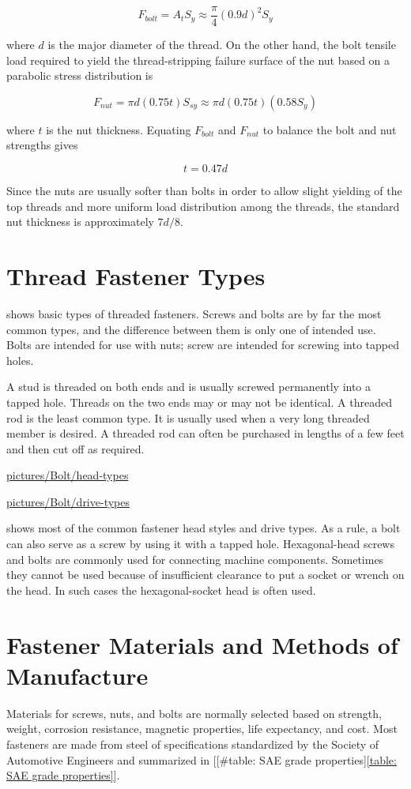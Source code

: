 \documentclass[a4paper,openany,12pt]{book}
\begin{document}
{{$$F_{bolt} = A_tS_y \approx \frac{\pi}{4}(0.9d)^2S_y$$

where \(d\) is the major diameter of the thread. On the other hand, the
bolt tensile load required to yield the thread-stripping failure surface
of the nut based on a parabolic stress distribution is

$$F_{nut} = \pi d(0.75t)S_{sy} \approx \pi d(0.75t)(0.58S_y)$$

where \(t\) is the nut thickness. Equating \(F_{bolt}\) and \(F_{nut}\) to
balance the bolt and nut strengths gives


$$\label{eqn: required nut thickness}
  t = 0.47d$$

Since the nuts are usually softer than bolts in order to allow slight
yielding of the top threads and more uniform load distribution among the
threads, the standard nut thickness is approximately \(7d/8\).

\section{Thread Fastener Types}
\label{thread-fastener-types}
shows basic types of threaded fasteners. Screws and bolts are by far the
most common types, and the difference between them is only one of
intended use. Bolts are intended for use with nuts; screw are intended
for screwing into tapped holes.


A stud is threaded on both ends and is usually screwed permanently into
a tapped hole. Threads on the two ends may or may not be identical. A
threaded rod is the least common type. It is usually used when a very
long threaded member is desired. A threaded rod can often be purchased
in lengths of a few feet and then cut off as required.


\url{pictures/Bolt/head-types}


\url{pictures/Bolt/drive-types}

shows most of the common fastener head styles and drive types. As a
rule, a bolt can also serve as a screw by using it with a tapped hole.
Hexagonal-head screws and bolts are commonly used for connecting machine
components. Sometimes they cannot be used because of insufficient
clearance to put a socket or wrench on the head. In such cases the
hexagonal-socket head is often used.

\section{Fastener Materials and Methods of Manufacture}
\label{fastener-materials-and-methods-of-manufacture}
Materials for screws, nuts, and bolts are normally selected based on
strength, weight, corrosion resistance, magnetic properties, life
expectancy, and cost. Most fasteners are made from steel of
specifications standardized by the Society of Automotive Engineers and
summarized in
[[\#table: SAE grade properties]\ref{table: SAE grade properties}].

}}
\end{document}
